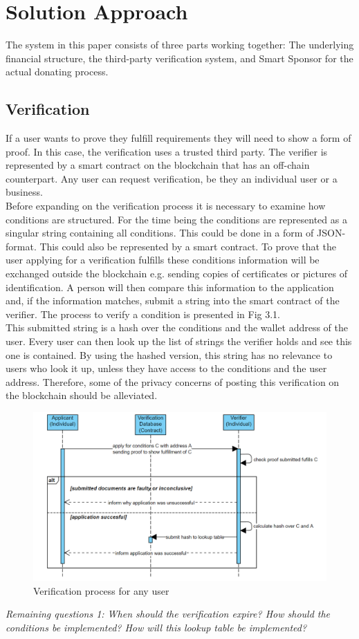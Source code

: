 \chapter{Solution Approach}
The system in this paper consists of three parts working together: The underlying financial structure, the third-party verification system, and Smart Sponsor for the actual donating process.
\section*{Verification}
If a user wants to prove they fulfill requirements they will need to show a form of proof. In this case, the verification uses a trusted third party. The verifier is represented by a smart contract on the blockchain that has an off-chain counterpart. Any user can request verification, be they an individual user or a business. \\
Before expanding on the verification process it is necessary to examine how conditions are structured. For the time being the conditions are represented as a singular string containing all conditions. This could be done in a form of JSON-format. This could also be represented by a smart contract. To prove that the user applying for a verification fulfills these conditions information will be exchanged outside the blockchain e.g. sending copies of certificates or pictures of identification. A person will then compare this information to the application and, if the information matches, submit a string into the smart contract of the verifier. The process to verify a condition is presented in Fig 3.1.\\
This submitted string is a hash over the conditions and the wallet address of the user. Every user can then look up the list of strings the verifier holds and see this one is contained. By using the hashed version, this string has no relevance to users who look it up, unless they have access to the conditions and the user address. Therefore, some of the privacy concerns of posting this verification on the blockchain should be alleviated.\\
\begin{figure}[H]
    \centering
    \includegraphics[scale=0.45]{figures/verification.PNG}  
    \caption{Verification process for any user}
    \label{fig:my_label}
\end{figure}
\emph{Remaining questions 1: When should the verification expire? How should the conditions be implemented? How will this lookup table be implemented?}
